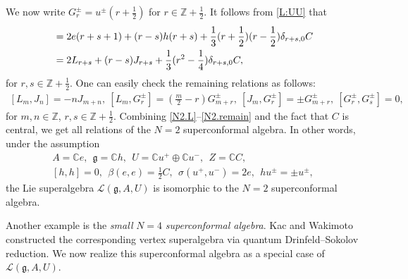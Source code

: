 \documentclass[12pt]{article}
\numberwithin{equation}{section}
\theoremstyle{definition}
\theoremstyle{plain}
\newcommand{\bC}{\ensuremath{\mathbb{C}}}
\newcommand{\bZ}{\ensuremath{\mathbb{Z}}}
\newcommand{\fg}{\mathfrak{g}}
\newcommand{\cL}{\ensuremath{\mathcal{L}}}
\begin{document}
We now write $G^\pm_r=u^\pm(r+\frac{1}{2})$ for $r\in\bZ+\frac{1}{2}$. It follows from \eqref{L:UU} that
\begin{align}
    [G^+_r,G^-_s]&=2e(r+s+1)+(r-s)h(r+s)+\frac{1}{3}(r+\frac{1}{2})(r-\frac{1}{2})\delta_{r+s,0}C\notag\\
    &=2L_{r+s}+(r-s)J_{r+s}+\frac{1}{3}(r^2-\frac{1}{4})\delta_{r+s,0}C,\label{N2.UU}
\end{align}
for $r,s\in\bZ+\frac{1}{2}$. One can easily check the remaining relations as follows:
\begin{align}\label{N2.remain}
    [L_m,J_n]=-nJ_{m+n},\  [L_m,G^\pm_r]=(\frac{m}{2}-r)G^\pm_{m+r},\  [J_m,G^\pm_r]=\pm G^\pm_{m+r},\  [G^\pm_r,G^\pm_s]=0,
\end{align}
for $m,n\in\bZ$, $r,s\in\bZ+\frac{1}{2}$. Combining \eqref{N2.L}--\eqref{N2.remain} and the fact that $C$ is central, we get all relations of the $N=2$ superconformal algebra. In other words, under the assumption 
\begin{gather*}
    A=\bC e,\ \ \fg=\bC h,\ \ U=\bC u^+\oplus\bC u^-,\ \ Z=\bC C,\\  
    [h,h]=0,\ \ \beta(e,e)=\frac{1}{2}C,\ \ \sigma(u^+,u^-)=2e,\ \ hu^\pm=\pm u^\pm,
\end{gather*}
the Lie superalgebra $\cL(\fg,A,U)$ is isomorphic to the $N=2$ superconformal algebra.

Another example is the \emph{small} $N=4$ \emph{superconformal algebra}. Kac and Wakimoto \cite{KW} constructed the corresponding vertex superalgebra via quantum Drinfeld--Sokolov reduction. We now realize this superconformal algebra as a special case of $\cL(\fg,A,U)$.
\end{document}
